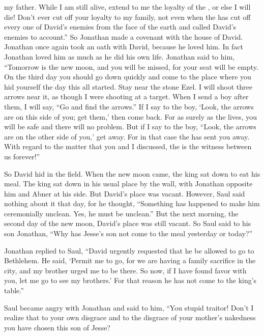 {my father.
While I
am still
alive,
extend
to me
the loyalty
of the {}, or
else I will die!
Don’t
ever
cut off
your loyalty
to my family,
not
even when the
{}
has cut off
every one
of David’s
enemies
from the face
of the earth
and called David’s
enemies
to account.”
So Jonathan
made a covenant with
the house
of David.
Jonathan
once again
took an oath
with David,
because he loved
him. In fact
Jonathan loved
him as much as he did his own life.
Jonathan
said
to him, “Tomorrow
is the new moon,
and you will be missed,
for your seat will be empty.
On the third
day you should go down
quickly
and come
to
the place
where
you hid
yourself the day
this all started.
Stay
near
the stone
Ezel.
I
will shoot three
arrows
near
it, as though I were shooting
at a target.
When I
send
a boy
after them, I will say,
“Go
and find
the
arrows.”
If
I say
to the boy,
‘Look,
the arrows
are on this side
of you; get
them,’ then come
back. For
as surely
as the
{}
lives, you will be safe
and there will no
problem.
But if
I
say
to the boy,
“Look,
the arrows
are on
the other side
of you,’ get away.
For
in that case the
{}
has sent you away.
With regard to the matter
that
you and I discussed,
the {}
is the witness between
us forever!”
\par }{\PP {}So David
hid
in the field.
When
the new moon
came,
the king
sat
down to eat his meal.
The king
sat down
in
his usual
place
by
the wall,
with Jonathan
opposite him and Abner
at his side.
But David’s
place
was vacant.
However, Saul
said
nothing
about it that
day,
for
he thought, “Something has happened
to make him ceremonially unclean.
Yes,
he must be unclean.”
But
the next
morning, the second
day of the new moon,
David’s
place
was still vacant.
So
Saul
said
to
his son
Jonathan,
“Why
has Jesse’s
son
not
come
to the meal
yesterday
or today?”
\par }{\PP {}Jonathan
replied
to Saul,
“David
urgently
requested
that he be allowed
to go to Bethlehem.
He
said,
‘Permit
me
to go, for
we are having a family
sacrifice
in the city,
and my brother
urged
me to be there. So now,
if
I have found
favor
with you, let
me go to see
my brothers.’
For that reason
he has not
come
to
the king’s
table.”
\par }{\PP {}Saul
became angry
with Jonathan
and said
to him, “You stupid
traitor! Don’t
I realize
that
to your own disgrace
and to the disgrace
of your mother’s
nakedness
you
have chosen
this son
of Jesse?
}
